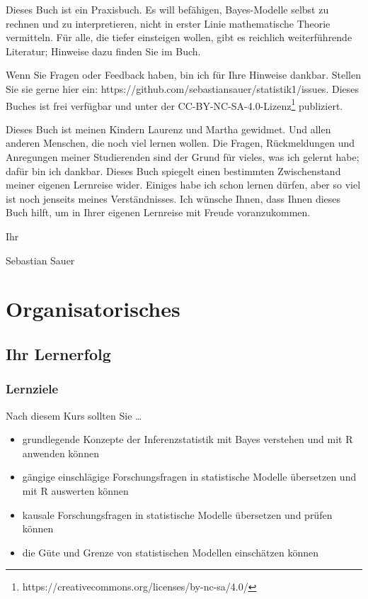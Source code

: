 \documentclass[
  ngerman,
  letterpaper,
  twoside,
  open=any]{scrbook}
\providecommand{\tightlist}{%
  \setlength{\itemsep}{0pt}\setlength{\parskip}{0pt}}\usepackage{longtable,booktabs,array}
\theoremstyle{definition}
\theoremstyle{plain}
\theoremstyle{definition}
\theoremstyle{definition}
\theoremstyle{definition}
\theoremstyle{definition}
\theoremstyle{remark}
\begin{document}
Dieses Buch ist ein Praxisbuch. Es will befähigen, Bayes-Modelle selbst
zu rechnen und zu interpretieren, nicht in erster Linie mathematische
Theorie vermitteln. Für alle, die tiefer einsteigen wollen, gibt es
reichlich weiterführende Literatur; Hinweise dazu finden Sie im Buch.

Wenn Sie Fragen oder Feedback haben, bin ich für Ihre Hinweise dankbar.
Stellen Sie sie gerne hier ein:
https://github.com/sebastiansauer/statistik1/issues. Dieses Buches ist
frei verfügbar und unter der CC-BY-NC-SA-4.0-Lizenz\footnote{https://creativecommons.org/licenses/by-nc-sa/4.0/}
publiziert.

Dieses Buch ist meinen Kindern Laurenz und Martha gewidmet. Und allen
anderen Menschen, die noch viel lernen wollen. Die Fragen, Rückmeldungen
und Anregungen meiner Studierenden sind der Grund für vieles, was ich
gelernt habe; dafür bin ich dankbar. Dieses Buch spiegelt einen
bestimmten Zwischenstand meiner eigenen Lernreise wider. Einiges habe
ich schon lernen dürfen, aber so viel ist noch jenseits meines
Verständnisses. Ich wünsche Ihnen, dass Ihnen dieses Buch hilft, um in
Ihrer eigenen Lernreise mit Freude voranzukommen.

Ihr

Sebastian Sauer

\clearpage 
\setcounter{tocdepth}{1}
\tableofcontents 

\cleardoublepage  %
\setcounter{page}{1}    %


\chapter{Organisatorisches}\label{organisatorisches}

\section{Ihr Lernerfolg}\label{ihr-lernerfolg}

\subsection{Lernziele}\label{lernziele}

Nach diesem Kurs sollten Sie \ldots{}

\begin{itemize}
\tightlist
\item
  grundlegende Konzepte der Inferenzstatistik mit Bayes verstehen und
  mit R anwenden können
\item
  gängige einschlägige Forschungsfragen in statistische Modelle
  übersetzen und mit R auswerten können
\item
  kausale Forschungsfragen in statistische Modelle übersetzen und prüfen
  können
\item
  die Güte und Grenze von statistischen Modellen einschätzen können
\end{itemize}
\end{document}
